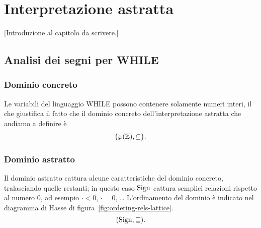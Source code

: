 
\chapter{Interpretazione astratta}

[Introduzione al capitolo da scrivere.]

\section{Analisi dei segni per WHILE}

\subsection{Dominio concreto}

Le variabili del linguaggio WHILE possono contenere solamente numeri interi,
il che giustifica il fatto che il dominio concreto dell'interpretazione
astratta che andiamo a definire è
\[
  \bigl(\wp(\mathbb{Z}), \subseteq\bigr).
\]

\subsection{Dominio astratto}

Il dominio astratto cattura alcune caratteristiche del dominio concreto,
tralasciando quelle restanti; in questo caso
$\mathrm{Sign}$ cattura semplici relazioni rispetto al
numero $0$, ad esempio $\cdot < 0$, $\cdot = 0$, \dots
L'ordinamento del dominio è indicato nel diagramma di Hasse di
figura~\ref{fig:ordering-rels-lattice}.
\[
  (\mathrm{Sign}, \sqsubseteq).
\]

